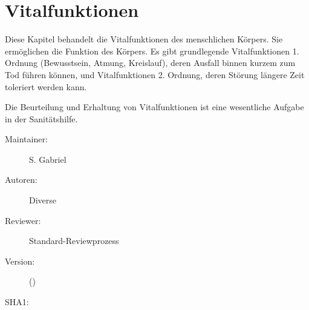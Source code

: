 % 
\def\ChapterCode{VIT}
\chapter
[\CO{[VIT]} Vitalfunktionen]
{Vitalfunktionen}




% 
% 

\ChapterIntro
{Diese Kapitel behandelt die Vitalfunktionen
des menschlichen Körpers. Sie ermöglichen die Funktion des
Körpers. Es gibt grundlegende Vitalfunktionen 1. Ordnung
(Bewusstsein, Atmung, Kreislauf), deren Ausfall binnen
kurzem zum Tod führen können, und Vitalfunktionen 2.
Ordnung, deren
Störung längere Zeit toleriert werden kann.

Die Beurteilung und Erhaltung von Vitalfunktionen ist eine
wesentliche Aufgabe in der Sanitätshilfe.
}{%
\begin{description}
  \item[Maintainer:] S. Gabriel
  \item[Autoren:] Diverse
  \item[Reviewer:] Standard-Reviewprozess
  \item[Version:] {\VarDocVersionTypeName} ({\VarDocVersionTypeDescription})
  \item[SHA1:] {\DocGitCommit}
\end{description}

{\TxTeilkapitelAASS}
}

\ChapterEnd